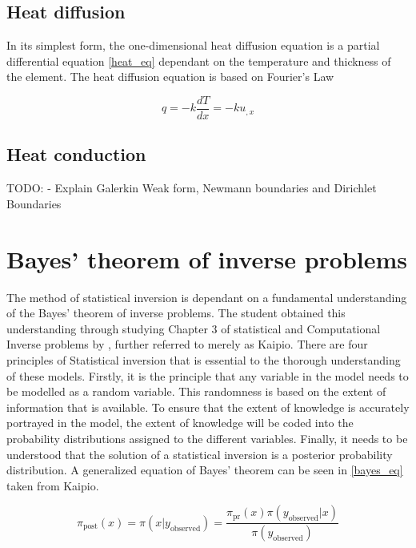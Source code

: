 	\subsection{Heat diffusion}	 
	 In its simplest form, the one-dimensional heat diffusion equation is a partial differential equation \ref{heat_eq} dependant on the temperature and thickness of the element. 
	The heat diffusion equation is based on Fourier's Law 
	
	
	\begin{equation}
	\label{heat_eq}
		q = -k \frac{dT}{dx} = -k u_{,x}
	\end{equation}
	\subsection{Heat conduction}
	TODO: - Explain Galerkin Weak form, Newmann boundaries and Dirichlet Boundaries

\section{Bayes' theorem of inverse problems}
	The method of statistical inversion is dependant on a fundamental understanding of the Bayes' theorem of inverse problems. 
	The student obtained this understanding through studying Chapter 3 of statistical and Computational Inverse problems by \citet{Kaipo:2005}, further referred to merely as Kaipio. 
	There are four principles of Statistical inversion that is essential to the thorough understanding of these models. 
	Firstly, it is the principle that any variable in the model needs to be modelled as a random variable. 
	This randomness is based on the extent of information that is available. 
	To ensure that the extent of knowledge is accurately portrayed in the model, the extent of knowledge will be coded into the probability distributions assigned to the different variables. 
	Finally, it needs to be understood that the solution of a statistical inversion is a posterior probability distribution.
	A generalized equation of Bayes' theorem can be seen in \ref{bayes_eq} taken from Kaipio. 
	
	\begin{equation}
	\label{bayes_eq}
	\pi_{\text{post}}(x) = \pi(x|y_{\text{observed}}) = \frac{\pi_{\text{pr}}(x) \pi(y_{\text{observed}}|x)}{\pi (y_{\text{observed}})}	
	\end{equation}
	
